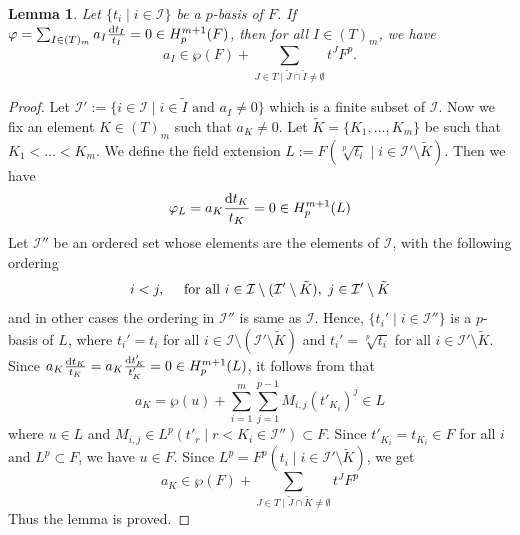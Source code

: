 \documentclass[times,10pt]{amsart}
\newcommand{\dd}{{\rm d}}
\newcommand{\I}{\ensuremath{\mathcal{I}}}
\renewcommand{\phi}{\varphi}
\newtheorem{lemma}[thm]{Lemma}%
\begin{document}
     \begin{lemma}\label{lnu}
         Let $\{ t_i\mid i\in \I\}$ be a $p$-basis of $F$. If $ \phi= \sum_{I\in (T)_m} a_I \frac{\dd t_I}{ t_I}=0\in  H_p^{m+1}(F)$,  then for all $I\in (T)_m$, we have $$  a_I\in \wp(F) + \sum_{J\in T\mid \tilde{J}\cap \tilde{I}\neq \emptyset} t^J F^p.$$
     \end{lemma}
     \begin{proof}
         Let $\I':=\{ i\in \I\mid  i\in \tilde{I}\text{ and } a_I\neq 0\}$ {which} is a finite subset of $\I$. Now we fix an element $K\in (T)_m$ such that $a_K\neq 0$. Let $\tilde{K}= \{K_1,\ldots,K_m\}$ be such that $K_1<\ldots<K_m$.  We define the field extension $L:= F( \sqrt[p]{t_i}\mid i\in \I'\setminus  \tilde{K})$.  Then we have  $$ \phi_L= a_K \frac{\dd t_K}{t_K}=0\in H_p^{m+1}(L)$$ Let $\I''$ be an ordered set whose elements are the elements of $\I$, with  the following  ordering  $$ i<  j, \quad \text{ for all } i\in \I\setminus (\I'\setminus \tilde{K}),\hspace{1mm} j\in \I'\setminus \tilde{K}$$ and  in other cases the  ordering in $\I''$ is same as $\I$. Hence, $\{ t_i'\mid i\in \I''\}$ is a $p$-basis of $L$, where $ t_i'=t_i$ for all $i\in \I\setminus ( \I'\setminus \tilde{K})$ and $ t_i'=  \sqrt[p]{t_i}$ for all $ i\in \I'\setminus \tilde{K}$. Since $a_K\frac{\dd t_K}{t_K}=a_K\frac{\dd t'_K}{t'_K}=0\in H_p^{m+1}(L)$, it follows from \cite[Proposition 3.3]{AAB} that  $$  a_K= \wp(u) + \sum_{i=1}^{m} \sum_{j=1}^{p-1} M_{i,j} (t'_{K_i})^j\in L$$ where $ u\in L$   and $M_{i,j}\in L^p( t'_r\mid r< K_i\in \I'') \subset F$. Since $ t'_{K_i}=t_{K_i}\in F$ for all $i$ and $L^p\subset F$, we have $ u\in F$.  Since $L^p=F^p( t_i\mid i\in \I'\setminus \tilde{K})$, we get $$  a_K\in \wp(F)+ \sum_{J\in T\mid \tilde{J}\cap \tilde{K}\neq \emptyset}t^J F^p$$ Thus the lemma is proved.\end{proof}
\end{document}
